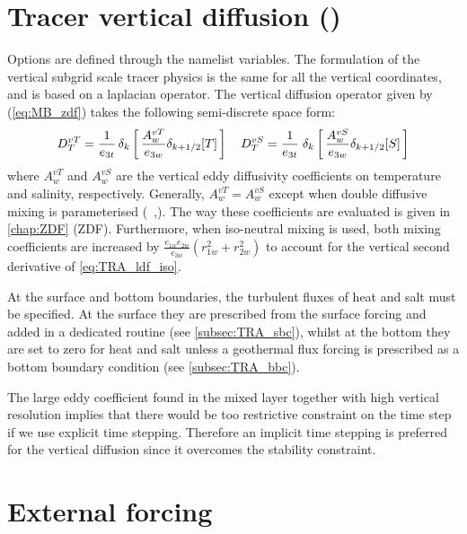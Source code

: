 \documentclass[../main/NEMO_manual]{subfiles}
\begin{document}
\section[Tracer vertical diffusion (\textit{trazdf.F90})]{Tracer vertical diffusion (\protect{})}
\label{sec:TRA_zdf}

Options are defined through the  namelist variables.
The formulation of the vertical subgrid scale tracer physics is the same for
all the vertical coordinates, and is based on a laplacian operator.
The vertical diffusion operator given by (\autoref{eq:MB_zdf}) takes
the following semi-discrete space form:
\[
  D^{vT}_T = \frac{1}{e_{3t}} \, \delta_k \left[ \, \frac{A^{vT}_w}{e_{3w}} \delta_{k + 1/2}[T] \, \right] \quad
  D^{vS}_T = \frac{1}{e_{3t}} \; \delta_k \left[ \, \frac{A^{vS}_w}{e_{3w}} \delta_{k + 1/2}[S] \, \right]
\]
where $A_w^{vT}$ and $A_w^{vS}$ are the vertical eddy diffusivity coefficients on
temperature and salinity, respectively.
Generally, $A_w^{vT} = A_w^{vS}$ except when double diffusive mixing is parameterised
(\ie\ ,).
The way these coefficients are evaluated is given in \autoref{chap:ZDF} (ZDF).
Furthermore, when iso-neutral mixing is used,
both mixing coefficients are increased by $\frac{e_{1w} e_{2w}}{e_{3w} }({r_{1w}^2 + r_{2w}^2})$ to
account for the vertical second derivative of \autoref{eq:TRA_ldf_iso}.

At the surface and bottom boundaries, the turbulent fluxes of heat and salt must be specified.
At the surface they are prescribed from the surface forcing and added in a dedicated routine
(see \autoref{subsec:TRA_sbc}), whilst at the bottom they are set to zero for heat and salt unless
a geothermal flux forcing is prescribed as a bottom boundary condition (see \autoref{subsec:TRA_bbc}).

The large eddy coefficient found in the mixed layer together with high vertical resolution implies
that there would be too restrictive constraint on the time step if we use explicit time stepping.
Therefore an implicit time stepping is preferred for the vertical diffusion since
it overcomes the stability constraint.

\section{External forcing}
\label{sec:TRA_sbc_qsr_bbc}
\end{document}
